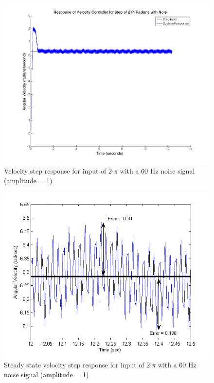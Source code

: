 \documentclass{article}
\theoremstyle{plain}
\theoremstyle{definition}
\theoremstyle{remark}
\begin{document}
\begin{figure}[htb]
\begin{center}
\includegraphics[width = 12cm]{velstep2PiwNoise.png}
\caption{Velocity step response for input of 2$\cdot{\pi}$ with a 60 Hz noise signal (amplitude = 1)}
\label{q6_7}
\end{center}
\end{figure}

\begin{figure}[htb]
\begin{center}
\includegraphics[width = 12cm]{VelErrorNoise.png}
\caption{Steady state velocity step response for input of 2$\cdot\pi$ with a 60 Hz noise signal (amplitude = 1)}
\label{VelNoiseZoom}
\end{center}
\end{figure}
\end{document}
